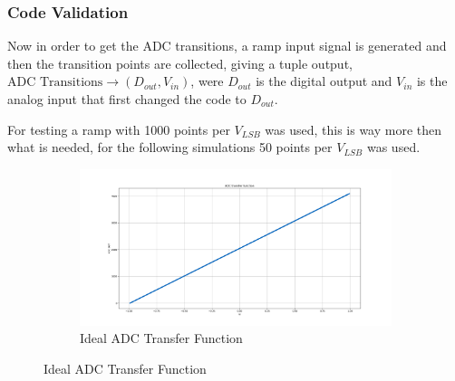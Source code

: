 \subsubsection{Code Validation}

Now in order to get the ADC transitions, a ramp input signal is generated and then the transition points are collected, giving a tuple output, $\text{ADC Transitions} \longrightarrow ( D_{out}, V_{in} ) $, were $D_{out}$ is the digital output and $V_{in}$ is the analog input that first changed the code to $D_{out}$. 

For testing a ramp with 1000 points per $V_{LSB}$ was used, this is way more then what is needed, for the following simulations 50 points per $V_{LSB}$ was used.


\begin{figure}[h]
    \centering

    \begin{subfigure}[b]{0.9\textwidth}
        \centering
        \includegraphics[width=\textwidth]{Images/ADC_TransFunc_Ideal.png}
        \caption{Ideal ADC Transfer Function}
        \label{fig:ADC_TF_Ideal}
    \end{subfigure}%


\end{figure}
